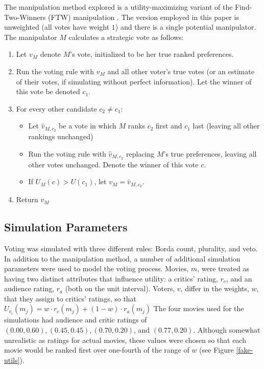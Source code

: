 \documentclass[12pt,letterpaper]{article} %
\begin{document}
The manipulation method explored is a utility-maximizing variant of the Find-Two-Winners (FTW) manipulation \citep{conitzer2006nonexistence}. The version employed in this paper is unweighted (all votes have weight $1$) and there is a single potential manipulator. The manipulator $M$ calculates a strategic vote as follows:
\begin{enumerate}
\item Let $v_M$ denote $M$'s vote, initialized to be her true ranked preferences.
\item Run the voting rule with $v_M$ and all other voter's true votes (or an estimate of their votes, if simulating without perfect information). Let the winner of this vote be denoted $c_1$.
\item For every other candidate $c_2 \neq c_1$:
  \begin{itemize}
    \item Let $\hat{v}_{M,c_2}$ be a vote in which $M$ ranks $c_2$ first and $c_1$ last (leaving all other rankings unchanged)
    \item Run the voting rule with $\hat{v}_{M,c_2}$ replacing $M$'s true preferences, leaving all other votes unchanged. Denote the winner of this vote $c$.
    \item If $U_M(c) > U(c_1)$, let $v_M=\hat{v}_{M,c_2}$.
  \end{itemize}
\item Return $v_M$
\end{enumerate}


\subsection{Simulation Parameters}

Voting was simulated with three different rules: Borda count, plurality, and veto. In addition to the manipulation method, a number of additional simulation parameters were used to model the voting process. Movies, $m$, were treated as having two distinct attributes that influence utility: a critics' rating, $r_c$, and an audience rating, $r_a$ (both on the unit interval). Voters, $v$, differ in the weights, $w$, that they assign to critics' ratings, so that $U_{v_i}(m_j) = w \cdot r_c(m_j) + (1-w) \cdot r_a(m_j)$ The four movies used for the simulations had audience and critic ratings of $(0.00, 0.60), (0.45, 0.45), (0.70, 0.20)$, and $(0.77, 0.20)$. Although somewhat unrealistic as ratings for actual movies, these values were chosen so that each movie would be ranked first over one-fourth of the range of $w$ (see Figure \ref{fake-utils}).
\end{document}
